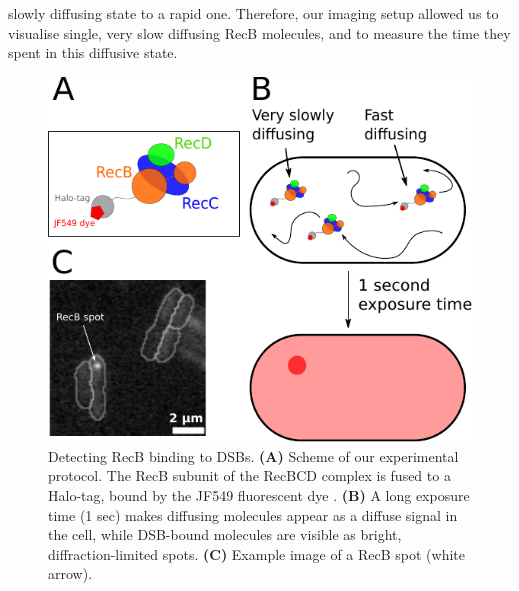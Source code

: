 slowly diffusing state to a rapid one. Therefore, our imaging setup allowed us to visualise single, very slow diffusing RecB molecules, and to measure the time they spent in this diffusive state.

\begin{figure}[htbp]
    \centering
    \includegraphics[width=.45\textwidth]{Figures/Fig1_Exp_principle.pdf}
    \caption{Detecting RecB binding to DSBs. \textbf{(A)} Scheme of our experimental protocol. The RecB subunit of the RecBCD complex is fused to a Halo-tag, bound by the JF549 fluorescent dye \cite{Lepore2019a, Lepore2023}. \textbf{(B)} A long exposure time (1 sec) makes diffusing molecules appear as a diffuse signal in the cell, while DSB-bound molecules are visible as bright, diffraction-limited spots. \textbf{(C)} Example image of a RecB spot (white arrow).}
    \label{Fig:exp_principle}
\end{figure}

